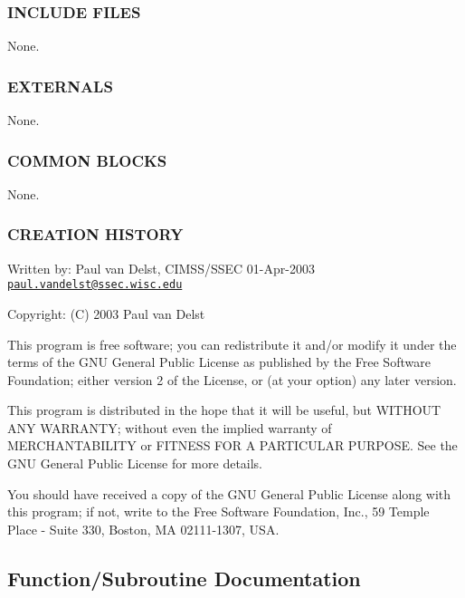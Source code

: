 \subsubsection*{I\+N\+C\+L\+U\+DE F\+I\+L\+ES}

None.

\subsubsection*{E\+X\+T\+E\+R\+N\+A\+LS}

None.

\subsubsection*{C\+O\+M\+M\+ON B\+L\+O\+C\+KS}

None.

\subsubsection*{C\+R\+E\+A\+T\+I\+ON H\+I\+S\+T\+O\+RY}

Written by\+: Paul van Delst, C\+I\+M\+S\+S/\+S\+S\+EC 01-\/\+Apr-\/2003 \href{mailto:paul.vandelst@ssec.wisc.edu}{\tt paul.\+vandelst@ssec.\+wisc.\+edu}

Copyright\+: (C) 2003 Paul van Delst

This program is free software; you can redistribute it and/or modify it under the terms of the G\+NU General Public License as published by the Free Software Foundation; either version 2 of the License, or (at your option) any later version.

This program is distributed in the hope that it will be useful, but W\+I\+T\+H\+O\+UT A\+NY W\+A\+R\+R\+A\+N\+TY; without even the implied warranty of M\+E\+R\+C\+H\+A\+N\+T\+A\+B\+I\+L\+I\+TY or F\+I\+T\+N\+E\+SS F\+OR A P\+A\+R\+T\+I\+C\+U\+L\+AR P\+U\+R\+P\+O\+SE. See the G\+NU General Public License for more details.

You should have received a copy of the G\+NU General Public License along with this program; if not, write to the Free Software Foundation, Inc., 59 Temple Place -\/ Suite 330, Boston, MA 02111-\/1307, U\+SA. 

\subsection{Function/\+Subroutine Documentation}
\mbox{\label{namespacem__compare__float__numbers_a041bd26aef7f9bbc8eb88b2f39e7755a}} 

